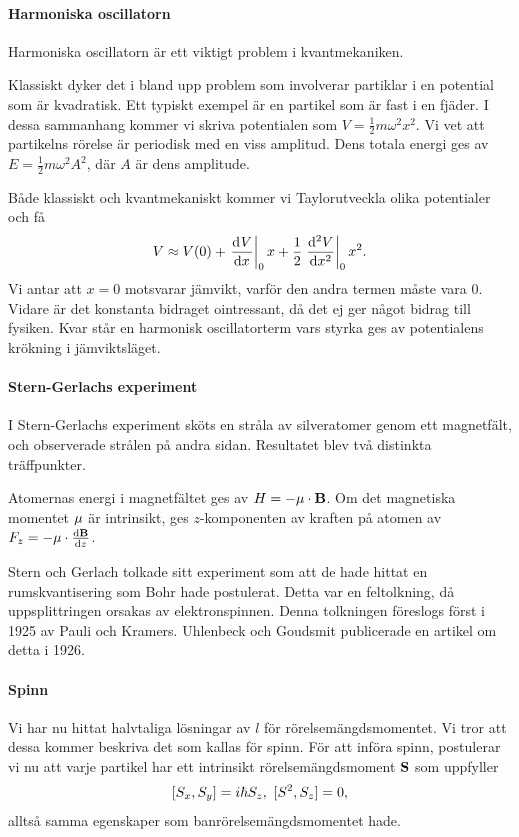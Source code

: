 \paragraph{Harmoniska oscillatorn}
Harmoniska oscillatorn är ett viktigt problem i kvantmekaniken.

Klassiskt dyker det i bland upp problem som involverar partiklar i en potential som är kvadratisk. Ett typiskt exempel är en partikel som är fast i en fjäder. I dessa sammanhang kommer vi skriva potentialen som $V = \frac{1}{2}m\omega^{2}x^{2}$. Vi vet att partikelns rörelse är periodisk med en viss amplitud. Dens totala energi ges av $E = \frac{1}{2}m\omega^{2}A^{2}$, där $A$ är dens amplitude.

Både klassiskt och kvantmekaniskt kommer vi Taylorutveckla olika potentialer och få
\begin{align*}
	V \approx V(0) + \deval{V}{x}{0}x + \frac{1}{2}\deval[2]{V}{x}{0}x^{2}.
\end{align*}
Vi antar att $x = 0$ motsvarar jämvikt, varför den andra termen måste vara $0$. Vidare är det konstanta bidraget ointressant, då det ej ger något bidrag till fysiken. Kvar står en harmonisk oscillatorterm vars styrka ges av potentialens krökning i jämviktsläget.

\paragraph{Stern-Gerlachs experiment}
I Stern-Gerlachs experiment sköts en stråla av silveratomer genom ett magnetfält, och observerade strålen på andra sidan. Resultatet blev två distinkta träffpunkter.

Atomernas energi i magnetfältet ges av $H = -\vb{\mu}\cdot\vb{B}$. Om det magnetiska momentet $\vb{\mu}$ är intrinsikt, ges $z$-komponenten av kraften på atomen av $F_{z} = -\vb{\mu}\cdot\dv{\vb{B}}{z}$.

Stern och Gerlach tolkade sitt experiment som att de hade hittat en rumskvantisering som Bohr hade postulerat. Detta var en feltolkning, då uppsplittringen orsakas av elektronspinnen. Denna tolkningen föreslogs först i 1925 av Pauli och Kramers. Uhlenbeck och Goudsmit publicerade en artikel om detta i 1926.

\paragraph{Spinn}
Vi har nu hittat halvtaliga lösningar av $l$ för rörelsemängdsmomentet. Vi tror att dessa kommer beskriva det som kallas för spinn. För att införa spinn, postulerar vi nu att varje partikel har ett intrinsikt rörelsemängdsmoment $\vb{S}$ som uppfyller
\begin{align*}
	[S_{x}, S_{y}] = i\hbar S_{z},\ [S^{2}, S_{z}] = 0,
\end{align*}
alltså samma egenskaper som banrörelsemängdsmomentet hade.

